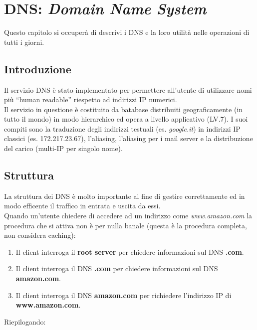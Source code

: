 \documentclass[12pt]{article}
\begin{document}
\section{DNS: \textit{Domain Name System}} \label{sec:dns} %
Questo capitolo si occuperà di descrivi i DNS e la loro utilità nelle operazioni di tutti i giorni.

\subsection{Introduzione} %
Il servizio DNS è stato implementato per permettere all'utente di utilizzare nomi più ``human readable'' riespetto ad indirizzi IP numerici.\\
Il servizio in questione è costituito da batabase distribuiti geograficamente (in tutto il mondo) in modo hierarchico ed opera a livello applicativo (LV.7). I suoi compiti sono la traduzione degli indirizzi testuali (es. \textit{google.it}) in indirizzi IP classici (es. 172.217.23.67), l'aliasing, l'aliasing per i mail server e la distribuzione del carico (multi-IP per singolo nome).

\subsection{Struttura} %
La struttura dei DNS è molto importante al fine di gestire correttamente ed in modo efficente il traffico in entrata e uscita da essi.\\
Quando un'utente chiedere di accedere ad un indirizzo come \textit{www.amazon.com} la procedura che si attiva non è per nulla banale (questa è la procedura completa, non considera caching):
\begin{enumerate}
  \item Il client interroga il \textbf{root server} per chiedere informazioni sul DNS \textbf{.com}.
  \item Il client interroga il DNS \textbf{.com} per chiedere informazioni sul DNS \textbf{amazon.com}.
  \item Il client interroga il DNS \textbf{amazon.com} per richiedere l'indirizzo IP di \textbf{www.amazon.com}.
\end{enumerate}
Riepilogando:
\end{document}
